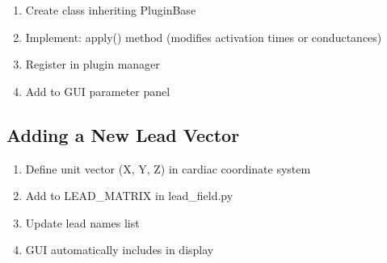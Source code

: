 \documentclass[11pt, a4paper]{article}
\begin{document}
\begin{enumerate}
    \item Create class inheriting PluginBase
    \item Implement: apply() method (modifies activation times or conductances)
    \item Register in plugin manager
    \item Add to GUI parameter panel
\end{enumerate}

\subsection{Adding a New Lead Vector}

\begin{enumerate}
    \item Define unit vector (X, Y, Z) in cardiac coordinate system
    \item Add to LEAD\_MATRIX in lead\_field.py
    \item Update lead names list
    \item GUI automatically includes in display
\end{enumerate}
\end{document}
